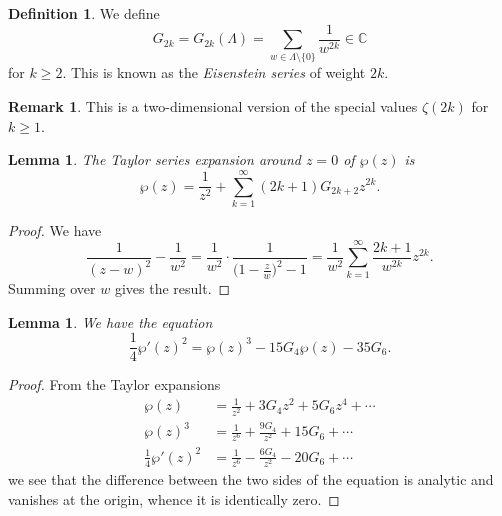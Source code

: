 \documentclass[a4paper]{article}
\newtheorem{lemma}[theorem]{Lemma}
\theoremstyle{definition}
\newtheorem*{definition}{Definition}
\newtheorem*{remark}{Remark}
\newcommand{\C}{\mathbb{C}}
\begin{document}
\begin{definition}
    We define
    \begin{equation*}
        G_{2k} = G_{2k}(\Lambda)
            = \sum_{w\in\Lambda\setminus\{0\}}\frac{1}{w^{2k}} \in \C
    \end{equation*}
    for $k\ge2$. This is known as the \emph{Eisenstein series} of weight $2k$.
\end{definition}

\begin{remark}
    This is a two-dimensional version of the special values $\zeta(2k)$ for
    $k\ge1$.
\end{remark}

\begin{lemma}
    The Taylor series expansion around $z=0$ of $\wp(z)$ is
    \begin{equation*}
        \wp(z) = \frac{1}{z^2} + \sum_{k=1}^\infty(2k+1)G_{2k+2}z^{2k}.
    \end{equation*}
\end{lemma}

\begin{proof}
    We have
    \begin{equation*}
        \frac{1}{(z-w)^2} - \frac{1}{w^2}
            = \frac{1}{w^2}\cdot\frac{1}{\bigl(1-\frac{z}{w}\bigr)^2-1}
            = \frac{1}{w^2}\sum_{k=1}^\infty\frac{2k+1}{w^{2k}}z^{2k}.
    \end{equation*}
    Summing over $w$ gives the result.
\end{proof}

\begin{lemma}
    We have the equation
    \begin{equation*}
        \frac{1}{4}\wp'(z)^2 = \wp(z)^3 - 15G_4\wp(z) - 35G_6.
    \end{equation*}
\end{lemma}

\begin{proof}
    From the Taylor expansions
    \begin{align*}
        \wp(z) &= \frac{1}{z^2} + 3G_4z^2 + 5G_6z^4 + \cdots \\
        \wp(z)^3 &= \frac{1}{z^6} + \frac{9G_4}{z^2} + 15G_6 + \cdots \\
        \frac{1}{4}\wp'(z)^2 &= \frac{1}{z^6} - \frac{6G_4}{z^2} - 20G_6 + \cdots
    \end{align*}
    we see that the difference between the two sides of the equation is analytic
    and vanishes at the origin, whence it is identically zero.
\end{proof}
\end{document}
